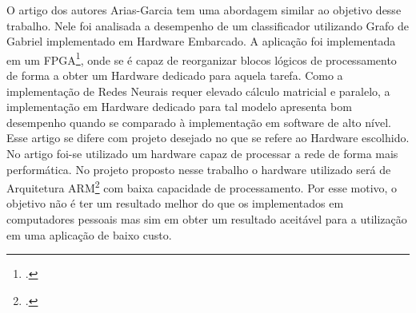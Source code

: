
O artigo dos autores Arias-Garcia\cite*{HardwareGabrielGraph} tem uma abordagem similar ao objetivo desse trabalho. Nele foi analisada a desempenho de um classificador utilizando Grafo de Gabriel implementado em Hardware Embarcado. A aplicação foi implementada em um FPGA\footcite[]{FPGA: Field-programmable gate array.}, onde se  é capaz de reorganizar blocos lógicos de processamento de forma a obter um Hardware dedicado para
aquela tarefa. Como a implementação de Redes Neurais requer elevado cálculo matricial e paralelo, a implementação em Hardware dedicado para tal modelo apresenta bom desempenho quando se comparado à implementação em software de alto nível.
Esse artigo se difere com projeto desejado no que se refere ao Hardware escolhido. No artigo foi-se utilizado um hardware capaz de processar a rede de forma mais performática.
No projeto proposto nesse trabalho o hardware utilizado será de Arquitetura ARM\footcite[]{ARM is a family of reduced instruction set computer (RISC) instruction set architectures for computer programming.} com baixa capacidade de processamento. 
Por esse motivo, o objetivo não é ter um resultado melhor do que os implementados em computadores pessoais mas sim em obter um resultado aceitável para a utilização em uma aplicação de baixo custo.
